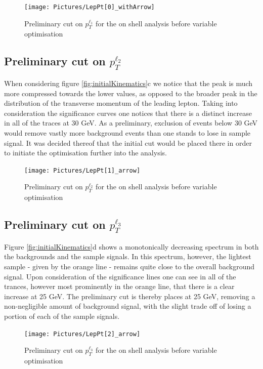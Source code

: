 \begin{figure}[H] %
   \centering
   \texttt{[image: Pictures/LepPt[0]\_withArrow]} 
   \caption{Preliminary cut on $p_{T}^{\ell_{1}}$ for the on shell analysis before variable optimisation}
   \label{fig:example}
\end{figure}

\subsection{Preliminary cut on $p_{T}^{\ell_{2}}$}

When considering figure \ref{fig:initialKinematics}c we notice that the peak is much more compressed towards the lower values, as opposed to the broader peak in the distribution of the transverse momentum of the leading lepton.
Taking into consideration the significance curves one notices that there is a distinct increase in all of the traces at 30 GeV.
As a preliminary, exclusion of events below 30 GeV would remove vastly more background events than one stands to lose in sample signal.
It was decided thereof that the initial cut would be placed there in order to initiate the optimisation further into the analysis.

\begin{figure}[H] %
   \centering
   \texttt{[image: Pictures/LepPt[1]\_arrow]} 
   \caption{Preliminary cut on $p_{T}^{\ell_{2}}$ for the on shell analysis before variable optimisation}
   \label{fig:example}
\end{figure}

\subsection{Preliminary cut on $p_{T}^{\ell_{3}}$}

Figure \ref{fig:initialKinematics}d shows a monotonically decreasing spectrum in both the backgrounds and the sample signals.
In this spectrum, however, the lightest sample - given by the orange line - remains quite close to the overall background signal.
Upon consideration of the significance lines one can see in all of the trances, however most prominently in the orange line, that there is a clear increase at 25 GeV.
The preliminary cut is thereby places at 25 GeV, removing a non-negligible amount of background signal, with the slight trade off of losing a portion of each of the sample signals.

\begin{figure}[H] %
   \centering
   \texttt{[image: Pictures/LepPt[2]\_arrow]} 
   \caption{Preliminary cut on $p_{T}^{\ell_{3}}$ for the on shell analysis before variable optimisation}
   \label{fig:example}
\end{figure}

